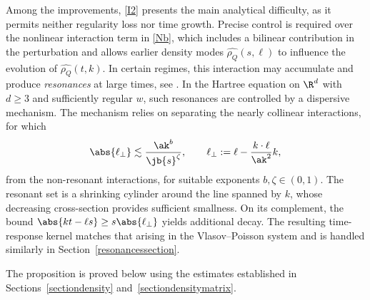 \begin{remark}
Among the improvements, \eqref{I2} presents the main analytical difficulty, as it permits neither regularity loss nor time growth. Precise control is required over the nonlinear interaction term in \eqref{Nb}, which includes a bilinear contribution in the perturbation and allows earlier density modes $\widehat{\rho_Q}(s,\ell)$ to influence the evolution of $\widehat{\rho_Q}(t,k)$. In certain regimes, this interaction may accumulate and produce \textit{resonances} at large times, see \eg \cite{Bedrossian2021Echoes}. In the Hartree equation on $\R^d$ with $d\geq 3$ and sufficiently regular $w$, such resonances are controlled by a dispersive mechanism. The mechanism relies on separating the nearly collinear interactions, for which
\begin{align*}
\abs{\ell_\perp}\lesssim\frac{\ak^{b}}{\jb{s}^{\zeta}},\qquad \ell_\perp:=\ell-\frac{k\cdot\ell}{\ak^2}k,
\end{align*}
from the non-resonant interactions, for suitable exponents $b,\zeta\in(0,1)$. The resonant set is a shrinking cylinder around the line spanned by $k$, whose decreasing cross-section provides sufficient smallness. On its complement, the bound $\abs{kt-\ell s}\geq s\abs{\ell_\perp}$ yields additional decay. The resulting time-response kernel matches that arising in the Vlasov--Poisson system and is handled similarly in Section~\ref{resonancessection}.
\end{remark}

The proposition is proved below using the estimates established in Sections~\ref{sectiondensity} and~\ref{sectiondensitymatrix}.

